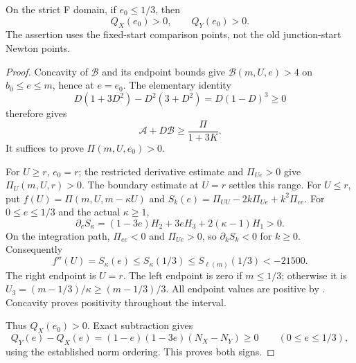 \begin{theorem}
\label{thm:paper-exact-mixed-certificate}
On the strict F domain, if $e_0\le1/3$, then
\[
 Q_X(e_0)>0,\qquad Q_Y(e_0)>0.
\]
The assertion uses the fixed-start comparison points, not the old
junction-start Newton points.
\end{theorem}
\begin{proof}
Concavity of $\mathcal B$ and its endpoint bounds give
$\mathcal B(m,U,e)>4$ on $b_0\le e\le m$, hence at $e=e_0$.
The elementary identity
\[
 D(1+3D^2)-D^2(3+D^2)=D(1-D)^3\ge0
\]
therefore gives
\[
 \mathcal A+D\mathcal B\ge\frac{\Pi}{1+3K}.
\]
It suffices to prove $\Pi(m,U,e_0)>0$.

For $U\ge r$, $e_0=r$; the restricted derivative estimate and
$\Pi_{Ue}>0$ give $\Pi_U(m,U,r)>0$.  The boundary estimate at $U=r$
settles this range.
For $U\le r$, put $f(U)=\Pi(m,U,m-\kappa U)$ and
$S_k(e)=\Pi_{UU}-2k\Pi_{Ue}+k^2\Pi_{ee}$.
For $0\le e\le1/3$ and the actual $\kappa\ge1$,
\[
 \partial_eS_\kappa=(1-3e)H_2+3eH_3+2(\kappa-1)H_1>0.
\]
On the integration path, $\Pi_{ee}<0$ and $\Pi_{Ue}>0$, so
$\partial_kS_k<0$ for $k\ge0$.  Consequently
\[
 f''(U)=S_\kappa(e)\le S_\kappa(1/3)
 \le S_{\ell(m)}(1/3)<-21500.
\]
The right endpoint is $U=r$.  The left endpoint is zero if $m\le1/3$;
otherwise it is $U_3=(m-1/3)/\kappa\ge(m-1/3)/3$.
All endpoint values are positive by
.  Concavity proves positivity
throughout the interval.

Thus $Q_X(e_0)>0$.  Exact subtraction gives
\[
 Q_Y(e)-Q_X(e)=(1-e)(1-3e)(N_X-N_Y)\ge0
 \qquad(0\le e\le1/3),
\]
using the established norm ordering.  This proves both signs.
\end{proof}
